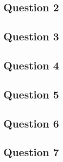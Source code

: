 \documentclass[12pt]{article}
\begin{document}
\subsection{Question 2}
\subsection{Question 3}
\subsection{Question 4}
\subsection{Question 5}
\subsection{Question 6}
\subsection{Question 7}
\end{document}

